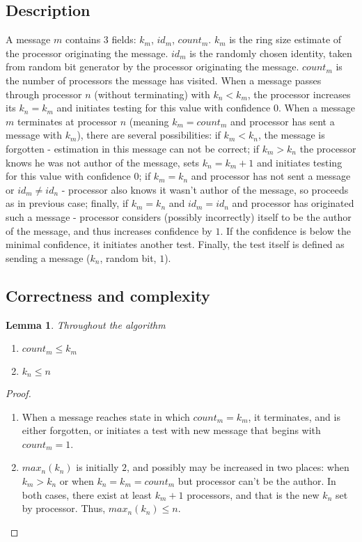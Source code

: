 \documentclass{article}
\newtheorem{lemma}{Lemma}
\begin{document}
\subsection{Description}
A message $m$ contains $3$ fields: $k_m$, $id_m$, $count_m$. $k_m$ is the ring size estimate of the processor originating the message. $id_m$ is the randomly chosen identity, taken from random bit generator by the processor originating the message. $count_m$ is the number of processors the message has visited. When a message passes through processor $n$ (without terminating) with $k_n < k_m$, the processor increases its $k_n = k_m$ and initiates testing for this value with confidence $0$. When a message $m$ terminates at processor $n$ (meaning $k_m = count_m$ and processor has sent a message with $k_m$), there are several possibilities: if $k_m < k_n$, the message is forgotten - estimation in this message can not be correct; if $k_m > k_n$ the processor knows he was not author of the message, sets $k_n = k_m + 1$ and initiates testing for this value with confidence $0$; if $k_m = k_n$ and processor has not sent a message or $id_m \neq id_n$ - processor also knows it wasn't author of the message, so proceeds as in previous case; finally, if $k_m = k_n$ and $id_m = id_n$ and processor has originated such a message - processor considers (possibly incorrectly) itself to be the author of the message, and thus increases confidence by $1$. If the confidence is below the minimal confidence, it initiates another test. Finally, the test itself is defined as sending a message ($k_n$, random bit, $1$).
\subsection{Correctness and complexity}
\begin{lemma}
Throughout the algorithm
\begin{enumerate}
    \item $count_m \leq k_m$
    \item $k_n \leq n$
\end{enumerate}
\end{lemma}
\begin{proof}
\begin{enumerate}
    \item When a message reaches state in which $count_m = k_m$, it terminates, and is either forgotten, or initiates a test with new message that begins with $count_m = 1$.
    \item $max_n(k_n)$ is initially $2$, and possibly may be increased in two places: when $k_m > k_n$ or when $k_n = k_m = count_m$ but processor can't be the author. In both cases, there exist at least $k_m + 1$ processors, and that is the new $k_n$ set by processor. Thus, $max_n(k_n) \leq n$.
\end{enumerate}
\end{proof}
\end{document}

